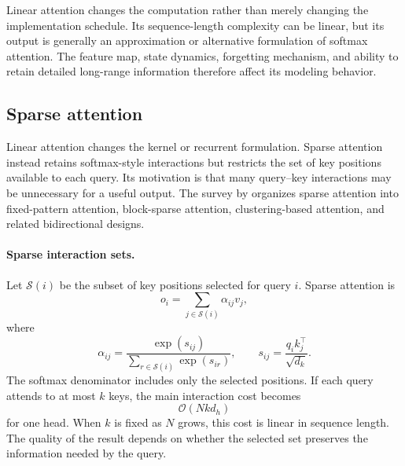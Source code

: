 Linear attention changes the computation rather than merely changing
the implementation schedule. Its sequence-length complexity can be
linear, but its output is generally an approximation or alternative
formulation of softmax attention. The feature map, state dynamics,
forgetting mechanism, and ability to retain detailed long-range
information therefore affect its modeling behavior.

\subsection{Sparse attention}
\label{subsec:attn-sparse-attention}

Linear attention changes the kernel or recurrent formulation. Sparse
attention instead retains softmax-style interactions but restricts the
set of key positions available to each query. Its motivation is that
many query--key interactions may be unnecessary for a useful output.
The survey by \textcite{sun2026efficientattention} organizes sparse
attention into fixed-pattern attention, block-sparse attention,
clustering-based attention, and related bidirectional designs.

\paragraph{Sparse interaction sets.}
Let \(\mathcal{S}(i)\) be the subset of key positions selected for query
\(i\). Sparse attention is
\begin{equation}
    o_i
    =
    \sum_{j\in\mathcal{S}(i)}
    \alpha_{ij}v_j,
    \label{eq:attn-sparse-output}
\end{equation}
where
\begin{equation}
    \alpha_{ij}
    =
    \frac{\exp(s_{ij})}
         {\displaystyle\sum_{r\in\mathcal{S}(i)}\exp(s_{ir})},
    \qquad
    s_{ij}=\frac{q_i k_j^\top}{\sqrt{d_k}}.
    \label{eq:attn-sparse-softmax}
\end{equation}
The softmax denominator includes only the selected positions. If each
query attends to at most \(k\) keys, the main interaction cost becomes
\begin{equation}
    \mathcal{O}(Nkd_h)
    \label{eq:attn-sparse-complexity}
\end{equation}
for one head. When \(k\) is fixed as \(N\) grows, this cost is linear
in sequence length. The quality of the result depends on whether the
selected set preserves the information needed by the query.

